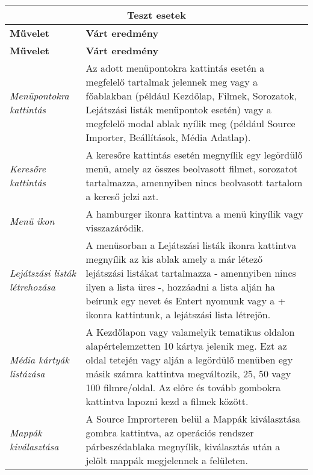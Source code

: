 \begin{center}
	\begin{longtable}{ | p{} | p{} | }

		\hline
		\multicolumn{2}{|c|}{\textbf{Teszt esetek}}
		\\ \hline

		\textbf{Művelet} & \textbf{Várt eredmény}
		\\ \hline \hline
		\endfirsthead %

		\hline
		\textbf{Művelet} & \textbf{Várt eredmény}
		\\ \hline \hline
		\endhead %

		\hline
		\endfoot %

		\endlastfoot %

		\emph{Menüpontokra kattintás}
		& Az adott menüpontokra kattintás esetén a megfelelő tartalmak jelennek meg vagy a főablakban (például Kezdőlap, Filmek, Sorozatok, Lejátszási listák menüpontok esetén) vagy a megfelelő modal ablak nyílik meg (például Source Importer, Beállítások, Média Adatlap).
		\\ \hline

		\emph{Keresőre kattintás}
		& A keresőre kattintás esetén megnyílik egy legördülő menü, amely az összes beolvasott filmet, sorozatot tartalmazza, amennyiben nincs beolvasott tartalom a kereső jelzi azt.
		\\ \hline

        \emph{Menü ikon}
		& A hamburger ikonra kattintva a menü kinyílik vagy visszazáródik.
		\\ \hline

        \emph{Lejátszási listák létrehozása}
		& A menüsorban a Lejátszási listák ikonra kattintva megnyílik az kis ablak amely a már létező lejátszási listákat tartalmazza - amennyiben nincs ilyen a lista üres -, hozzáadni a lista alján ha beírunk egy nevet és Entert nyomunk vagy a + ikonra kattintunk, a lejátszási lista létrejön.
		\\ \hline

        \emph{Média kártyák listázása}
		& A Kezdőlapon vagy valamelyik tematikus oldalon alapértelemzetten 10 kártya jelenik meg. Ezt az oldal tetején vagy alján a legördülő menüben egy másik számra kattintva megváltozik, 25, 50 vagy 100 filmre/oldal. Az előre és tovább gombokra kattintva lapozni kezd a filmek között.
		\\ \hline

		\emph{Mappák kiválasztása}
		& A Source Improrteren belül a Mappák kiválasztása gombra kattintva, az operációs rendszer párbeszédablaka megnyílik, kiválasztás után a jelölt mappák megjelennek a felületen.
		\\ \hline


\end{longtable}
\end{center}
